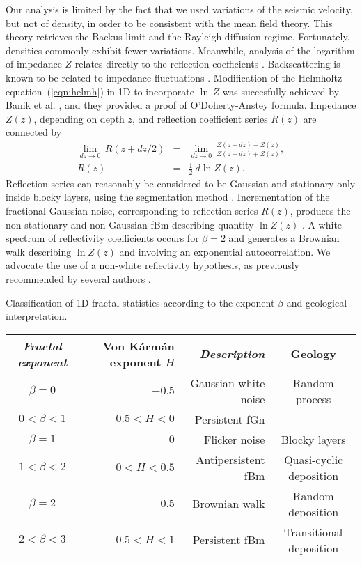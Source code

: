 Our analysis is limited by the fact that we used variations of the seismic velocity, 
but not of density, in order to be consistent with the mean field theory. 
This theory retrieves the Backus limit and the Rayleigh diffusion regime.
Fortunately, densities commonly exhibit fewer variations.
Meanwhile, analysis of the logarithm of impedance $Z$
relates directly to the reflection coefficients \cite[]{Shtatland_91}.
Backscattering is known to be related to
impedance fluctuations \cite[]{Banik_LS85,Wu_88}.
Modification of the Helmholtz equation~(\ref{eqn:helmh}) in 1D to incorporate $\ln\,Z$
was succesfully achieved by Banik et al. , and they provided a proof of O'Doherty-Anstey formula.
Impedance $Z(z)$, depending on depth $z$, and reflection coefficient series $R(z)$ are connected by
\begin{eqnarray}
\lim_{dz\rightarrow 0}\,R(z+dz/2) & = & \lim_{dz\rightarrow 0}\,\frac{Z(z+dz)-Z(z)}{Z(z+dz)+Z(z)},\\
R(z) & = & \frac{1}{2}~{d\ln Z(z)}.
\end{eqnarray}
Reflection series can reasonably be considered to be Gaussian and stationary
only inside blocky layers, using the segmentation method \cite[]{Todoeschuck_JL90}.
Incrementation of the fractional Gaussian noise, corresponding to
reflection series $R(z)$, produces the non-stationary and non-Gaussian fBm describing quantity $\ln Z(z)$
\cite[]{Shtatland_91}.
A white spectrum of reflectivity coefficients occurs for $\beta=2$ and generates a Brownian walk describing $\ln Z(z)$
and involving an exponential autocorrelation.
We advocate the use of a non-white reflectivity hypothesis, as previously recommended by 
several authors \cite[]{Todoeschuck_JL90,Lancaster_W00,Anstey_D02b}.




{Classification of 1D fractal statistics according to the exponent $\beta$ and geological interpretation.}
{
\begin{center}
    \begin{tabular}{|c|r|r|c|}
      \hline
      {\it Fractal exponent} & Von K\'arm\'an exponent $H$ & {\it Description} & {Geology} \\[0.2mm]
      \hline
      $\beta=0$     & $-0.5$       & Gaussian white noise & Random process \\[0.3mm]
      \hline
      $0<\beta<1$   & $-0.5<H<0$   & Persistent fGn & \\[0.3mm]
      \hline
      $\beta=1$     & $0$          & Flicker noise & Blocky layers\\[0.3mm]
      \hline
      $1<\beta<2$   & $0<H<0.5$    & Antipersistent fBm & Quasi-cyclic deposition \\[0.3mm]
      \hline
      $\beta=2$     & $0.5$        & Brownian walk & Random deposition \\[0.3mm]
      \hline
      $2<\beta<3$   & $0.5<H<1$    & Persistent fBm & Transitional deposition \\
      \hline
    \end{tabular}
\end{center}
}


